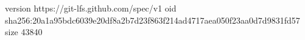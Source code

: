 version https://git-lfs.github.com/spec/v1
oid sha256:20a1a95bdc6039e20df8a2b7d23f863f214ad4717aea050f23aa0d7d9831fd57
size 43840
